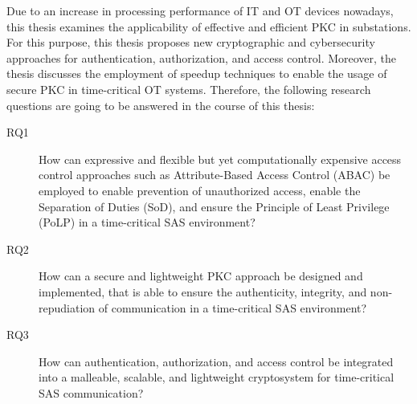 Due to an increase in processing performance of IT and OT devices nowadays, this thesis examines the applicability of effective and efficient PKC in substations.
For this purpose, this thesis proposes new cryptographic and cybersecurity approaches for authentication, authorization, and access control.
Moreover, the thesis discusses the employment of speedup techniques to enable the usage of secure PKC in time-critical OT systems.
Therefore, the following research questions are going to be answered in the course of this thesis:
\begin{description}
    \item[RQ1] How can expressive and flexible but yet computationally expensive access control approaches such as Attribute-Based Access Control (ABAC) be employed to enable prevention of unauthorized access, enable the Separation of Duties (SoD), and ensure the Principle of Least Privilege (PoLP) in a time-critical SAS environment?
    \item[RQ2] How can a secure and lightweight PKC approach be designed and implemented, that is able to ensure the authenticity, integrity, and non-repudiation of communication in a time-critical SAS environment?
    \item[RQ3] How can authentication, authorization, and access control be integrated into a malleable, scalable, and lightweight cryptosystem for time-critical SAS communication?
\end{description}

